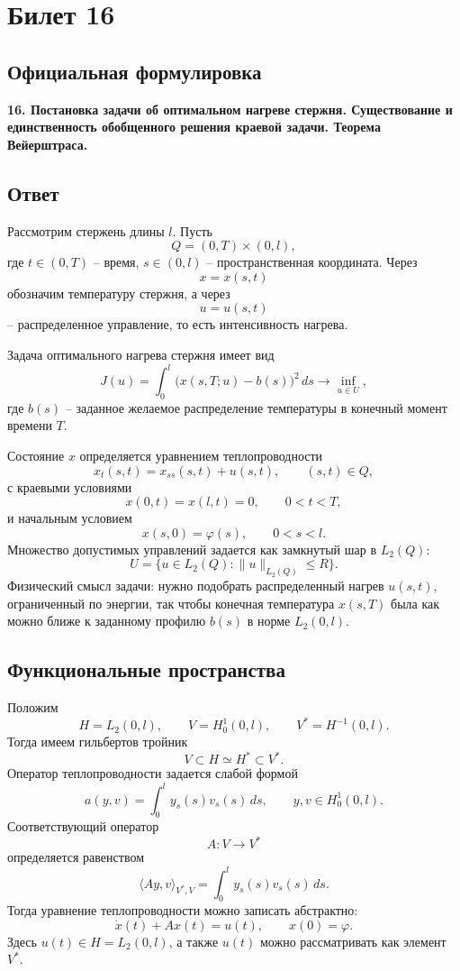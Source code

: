 \documentclass[12pt,a4paper]{article}
\begin{document}
\newpage

\section*{Билет 16}
\subsection*{Официальная формулировка}
\textbf{16. Постановка задачи об оптимальном нагреве стержня. Существование и единственность обобщенного решения краевой задачи. Теорема Вейерштраса.}

\subsection*{Ответ}
Рассмотрим стержень длины \(l\). Пусть
\[
Q=(0,T)\times(0,l),
\]
где \(t\in(0,T)\) -- время, \(s\in(0,l)\) -- пространственная координата. Через
\[
x=x(s,t)
\]
обозначим температуру стержня, а через
\[
u=u(s,t)
\]
-- распределенное управление, то есть интенсивность нагрева.

Задача оптимального нагрева стержня имеет вид
\[
J(u)=\int_0^l\bigl(x(s,T;u)-b(s)\bigr)^2\,ds\to\inf_{u\in U},
\]
где \(b(s)\) -- заданное желаемое распределение температуры в конечный момент времени \(T\).

Состояние \(x\) определяется уравнением теплопроводности
\[
x_t(s,t)=x_{ss}(s,t)+u(s,t),
\qquad (s,t)\in Q,
\]
с краевыми условиями
\[
x(0,t)=x(l,t)=0,
\qquad 0<t<T,
\]
и начальным условием
\[
x(s,0)=\varphi(s),
\qquad 0<s<l.
\]
Множество допустимых управлений задается как замкнутый шар в \(L_2(Q)\):
\[
U=\{u\in L_2(Q):\|u\|_{L_2(Q)}\le R\}.
\]
Физический смысл задачи: нужно подобрать распределенный нагрев \(u(s,t)\), ограниченный по энергии, так чтобы конечная температура \(x(s,T)\) была как можно ближе к заданному профилю \(b(s)\) в норме \(L_2(0,l)\).

\subsection*{Функциональные пространства}
Положим
\[
H=L_2(0,l),
\qquad
V=H_0^1(0,l),
\qquad
V^*=H^{-1}(0,l).
\]
Тогда имеем гильбертов тройник
\[
V\subset H\simeq H^*\subset V^*.
\]
Оператор теплопроводности задается слабой формой
\[
a(y,v)=\int_0^l y_s(s)v_s(s)\,ds,
\qquad y,v\in H_0^1(0,l).
\]
Соответствующий оператор
\[
A:V\to V^*
\]
определяется равенством
\[
\langle Ay,v\rangle_{V^*,V}=\int_0^l y_s(s)v_s(s)\,ds.
\]
Тогда уравнение теплопроводности можно записать абстрактно:
\[
\dot x(t)+Ax(t)=u(t),
\qquad x(0)=\varphi.
\]
Здесь \(u(t)\in H=L_2(0,l)\), а также \(u(t)\) можно рассматривать как элемент \(V^*\).
\end{document}
